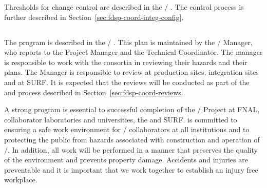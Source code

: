 Thresholds for change control are described in the
/ . The control process is further
described in Section~\ref{sec:fdsp-coord-integ-config}.

\subsection{}
\label{sec:fdsp-coord-esh}

The   program is described in the
/ . This plan is maintained by
the /  Manager, who reports to the
 Project Manager and the Technical Coordinator. The
 manager is responsible to work with the consortia in
reviewing their hazards and their  plans.  The 
Manager is responsible to review  at production sites,
integration sites and at SURF. It is expected that the 
reviews will be conducted as part of the  and 
process described in Section~\ref{sec:fdsp-coord-reviews}.

A strong  program is essential to successful completion of
the / Project at FNAL, collaborator laboratories and
universities, the  and SURF.  is committed to ensuring
a safe work environment for / collaborators at
all institutions and to protecting the public from hazards associated
with construction and operation of /. In
addition, all work will be performed in a manner that preserves the
quality of the environment and prevents property damage. Accidents and
injuries are preventable and it is important that we work together to
establish an injury free workplace.


